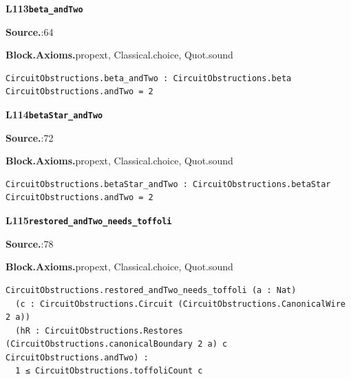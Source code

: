 \par\medskip\noindent\begin{minipage}{\textwidth}
{\small\bfseries L113\enspace\texttt{beta\_andTwo}\par}
{\footnotesize\raggedright\textbf{Source.}\enspace{}:64\par
\textbf{Block.}\quad\textbf{Axioms.}\enspace propext, Classical.choice, Quot.sound\par}\nopagebreak
\begin{lstlisting}
CircuitObstructions.beta_andTwo : CircuitObstructions.beta CircuitObstructions.andTwo = 2
\end{lstlisting}
\end{minipage}\par

\par\medskip\noindent\begin{minipage}{\textwidth}
{\small\bfseries L114\enspace\texttt{betaStar\_andTwo}\par}
{\footnotesize\raggedright\textbf{Source.}\enspace{}:72\par
\textbf{Block.}\quad\textbf{Axioms.}\enspace propext, Classical.choice, Quot.sound\par}\nopagebreak
\begin{lstlisting}
CircuitObstructions.betaStar_andTwo : CircuitObstructions.betaStar CircuitObstructions.andTwo = 2
\end{lstlisting}
\end{minipage}\par

\par\medskip\noindent\begin{minipage}{\textwidth}
{\small\bfseries L115\enspace\texttt{restored\_andTwo\_needs\_toffoli}\par}
{\footnotesize\raggedright\textbf{Source.}\enspace{}:78\par
\textbf{Block.}\quad\textbf{Axioms.}\enspace propext, Classical.choice, Quot.sound\par}\nopagebreak
\begin{lstlisting}
CircuitObstructions.restored_andTwo_needs_toffoli (a : Nat)
  (c : CircuitObstructions.Circuit (CircuitObstructions.CanonicalWire 2 a))
  (hR : CircuitObstructions.Restores (CircuitObstructions.canonicalBoundary 2 a) c CircuitObstructions.andTwo) :
  1 ≤ CircuitObstructions.toffoliCount c
\end{lstlisting}
\end{minipage}\par

\endgroup

